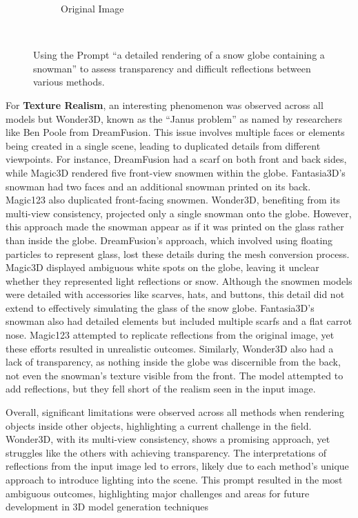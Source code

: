 \begin{figure}[ht]
\begin{subfigure}[b]{0.32\textwidth}
        \caption{Original Image}
        \vspace{0.1cm}
    \end{subfigure}
    \caption{Using the Prompt ``a detailed rendering of a snow globe containing a snowman'' to assess transparency and difficult reflections between various methods.}~\label{fig:resultGlobe}
\end{figure}

For \textbf{Texture Realism}, an interesting phenomenon was observed across all models but Wonder3D, known as the ``Janus problem'' as named by researchers like Ben Poole from DreamFusion. This issue involves multiple faces or elements being created in a single scene, leading to duplicated details from different viewpoints. For instance, DreamFusion had a scarf on both front and back sides, while Magic3D rendered five front-view snowmen within the globe. Fantasia3D's snowman had two faces and an additional snowman printed on its back. Magic123 also duplicated front-facing snowmen. Wonder3D, benefiting from its multi-view consistency, projected only a single snowman onto the globe. However, this approach made the snowman appear as if it was printed on the glass rather than inside the globe. DreamFusion's approach, which involved using floating particles to represent glass, lost these details during the mesh conversion process. Magic3D displayed ambiguous white spots on the globe, leaving it unclear whether they represented light reflections or snow. Although the snowmen models were detailed with accessories like scarves, hats, and buttons, this detail did not extend to effectively simulating the glass of the snow globe. Fantasia3D's snowman also had detailed elements but included multiple scarfs and a flat carrot nose. Magic123 attempted to replicate reflections from the original image, yet these efforts resulted in unrealistic outcomes. Similarly, Wonder3D also had a lack of transparency, as nothing inside the globe was discernible from the back, not even the snowman's texture visible from the front. The model attempted to add reflections, but they fell short of the realism seen in the input image.

Overall, significant limitations were observed across all methods when rendering objects inside other objects, highlighting a current challenge in the field. Wonder3D, with its multi-view consistency, shows a promising approach, yet struggles like the others with achieving transparency. The interpretations of reflections from the input image led to errors, likely due to each method's unique approach to introduce lighting into the scene. This prompt resulted in the most ambiguous outcomes, highlighting major challenges and areas for future development in 3D model generation techniques


